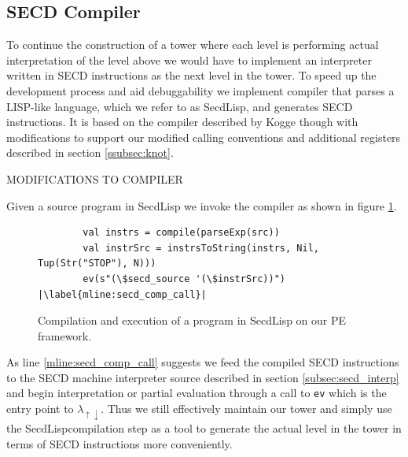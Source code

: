\documentclass{article}
\theoremstyle{definition}
\newcommand{\mslang}{$\lambda_{\uparrow\downarrow}$}
\newcommand{\secdlisp}{SecdLisp}
\begin{document}
\subsection{SECD Compiler}
To continue the construction of a tower where each level is performing actual interpretation of the level above we would have to implement an interpreter written in SECD instructions as the next level in the tower. To speed up the development process and aid debuggability we implement compiler that parses a LISP-like language, which we refer to as \secdlisp{}, and generates SECD instructions. It is based on the compiler described by Kogge \cite{kogge1990architecture} though with modifications to support our modified calling conventions and additional registers described in section \ref{ssubsec:knot}.

MODIFICATIONS TO COMPILER

Given a source program in \secdlisp{} we invoke the compiler as shown in figure \ref{lst:secd_comp_ex1}.

\begin{figure}[ht]
\centering
\begin{verbatim}
        val instrs = compile(parseExp(src))
        val instrSrc = instrsToString(instrs, Nil, Tup(Str("STOP"), N)))
        ev(s"(\$secd_source '(\$instrSrc))") |\label{mline:secd_comp_call}|
\end{verbatim}
\caption{Compilation and execution of a program in \secdlisp{} on our PE framework.}
\label{lst:secd_comp_ex1}
\end{figure}

As line \ref{mline:secd_comp_call} suggests we feed the compiled SECD instructions to the SECD machine interpreter source described in section \ref{subsec:secd_interp} and begin interpretation or partial evaluation through a call to \texttt{ev} which is the entry point to \mslang. Thus we still effectively maintain our tower and simply use the \secdlisp compilation step as a tool to generate the actual level in the tower in terms of SECD instructions more conveniently.
\end{document}

